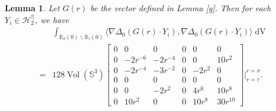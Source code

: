 \documentclass[11pt,letterpaper]{amsart}
\DeclareMathOperator{\Vol}{Vol}
\DeclareMathOperator{\dvol}{dV}
\newcommand{\bB}{\mathbb{B}}
\newcommand{\bS}{\mathbb{S}}
\newtheorem{lemma}[theorem]{Lemma}
\theoremstyle{definition}
\theoremstyle{remark}
\numberwithin{equation}{section}
\begin{document}
\begin{lemma}\label{energy-g}
    Let $G(r)$ be the vector defined in Lemma \ref{g}. Then for each $Y_i\in \mathcal{H}^{\bS}_{2}$, we have
\begin{equation}
\begin{split}
    &\int_{\bB_{\sigma}(0)\backslash \bB_{\tau}(0)}\langle \nabla \Delta_0 (G(r)\cdot Y_i), \nabla \Delta_0(G(r)\cdot Y_i)\rangle \dvol\\
    =&128 \Vol(\bS^3) \begin{bmatrix}
0 & 0 & 0 & 0 & 0& 0\\
0 & -2r^{-6} & -2r^{-4} & 0 & 0& 10r^2\\
0 & -2r^{-4} & {-3r^{-2}}& 0& -2r^2 & 0\\
0 & 0 & 0 & 0 & 0& 0\\
0 & 0 & -2r^2 & 0 & 4r^6& 10r^8\\
0 & 10r^2 & 0 & 0 & 10r^8& {30r^{10}}
\end{bmatrix}\Bigg|_{r=\tau}^{r=\sigma}.
\end{split}
\end{equation}
    
\end{lemma}
\end{document}
